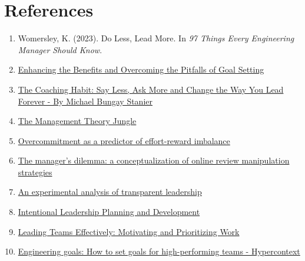 \documentclass[10pt]{article}
\begin{document}
\section*{References\vspace{\baselineskip}}
\begin{enumerate}
    \item Womersley, K. (2023). Do Less, Lead More. In \textit{97 Things Every Engineering Manager Should Know}.
    \item \href{https://d1wqtxts1xzle7.cloudfront.net/44281214/Enhancing_the_Benefits_and_Overcoming_th20160331-30923-1dg1jj9-libre.pdf?1459484708=&response-content-disposition=inline%3B+filename%3DEnhancing_the_Benefits_and_Overcoming_th.pdf&Expires=1701301623&Signature=G6tq5ZEDupVmoRkvGZNQhYYWUDko9Iemqd6uI01oL9ml2Xy2N8i6LscLHJWyM0~Uihi6wuyCCeSQlbn1gy25JtOJGWbWlCwH2U3vDxIGsLntH86JhVZ-kmZxvjSB9UunZUJiC1CKDASrHYIwhPvjEFcgMCDTFOVzwHXu20GCDw3jm1halgrf4CdPW4smBbGv4RsSEGQPE896On4Fq5AooSKW98wrGDHrQPFJDzZH~RhC4~FWGuBMnSfpV9Jblp~c19y5d6kpfF06CxmsxK-gjSxfoGgnoys4BWDgQ-n8nuYk3JVTv6DHi-mkkSrV3QJw1ZNdREHzOknoTLTIPuRwMQ__&Key-Pair-Id=APKAJLOHF5GGSLRBV4ZA}{Enhancing the Benefits and Overcoming the Pitfalls of Goal Setting}
    \item \href{https://books.google.ca/books?hl=en&lr=&id=EGFPDAAAQBAJ&oi=fnd&pg=PA7&dq=Do+Less,+Lead+more&ots=YAZwk04QIC&sig=Y19gqgWCzry_I-GmdG1u3ecUJGs#v=onepage&q&f=false}{The Coaching Habit: Say Less, Ask More and Change the Way You Lead Forever - By Michael Bungay Stanier}
    \item \href{https://journals.aom.org/doi/abs/10.5465/254541}{The Management Theory Jungle}
    \item \href{https://www.jstor.org/stable/43999296}{Overcommitment as a predictor of effort-reward imbalance}
    \item \href{https://www.tandfonline.com/doi/full/10.1080/13683500.2015.1127337}{The manager's dilemma: a conceptualization of online review manipulation strategies}
    \item \href{https://www.sciencedirect.com/science/article/pii/S0167268114001449}{An experimental analysis of transparent leadership}
    \item \href{https://advancesinsocialwork.iupui.edu/index.php/advancesinsocialwork/article/view/18606}{Intentional Leadership Planning and Development}
    \item \href{https://link.springer.com/chapter/10.1007/978-3-319-11107-0_9}{Leading Teams Effectively: Motivating and Prioritizing Work}
    \item \href{https://hypercontext.com/blog/work-goals/engineering-goals}{Engineering goals: How to set goals for high-performing teams - Hypercontext}

\end{enumerate}
\end{document}
